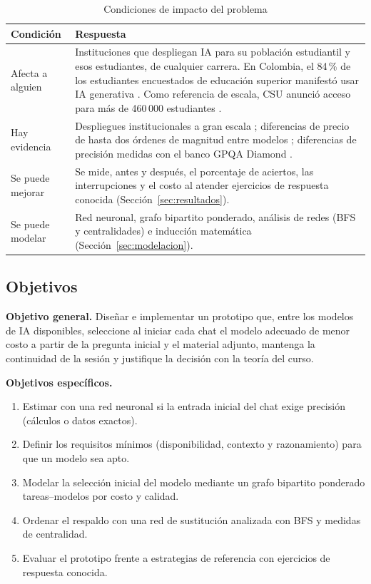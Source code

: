\documentclass[12pt,letterpaper]{article}
\begin{document}
\begin{table}[htbp]
\caption{Condiciones de impacto del problema}\label{tab:impacto}
\small
\begin{tabularx}{\textwidth}{>{\raggedright\arraybackslash}p{2.6cm}X}
\toprule
\textbf{Condición} & \textbf{Respuesta} \\
\midrule
Afecta a alguien & Instituciones que despliegan IA para su población estudiantil y esos estudiantes, de cualquier carrera. En Colombia, el 84\,\% de los estudiantes encuestados de educación superior manifestó usar IA generativa \parencite{impactotic2024}. Como referencia de escala, CSU anunció acceso para más de 460\,000 estudiantes \parencite{axios2025csu}. \\
Hay evidencia & Despliegues institucionales a gran escala \parencite{axios2025csu}; diferencias de precio de hasta dos órdenes de magnitud entre modelos \parencite{openrouter2026}; diferencias de precisión medidas con el banco GPQA Diamond \parencite{rein2023gpqa}. \\
Se puede mejorar & Se mide, antes y después, el porcentaje de aciertos, las interrupciones y el costo al atender ejercicios de respuesta conocida (Sección~\ref{sec:resultados}). \\
Se puede modelar & Red neuronal, grafo bipartito ponderado, análisis de redes (BFS y centralidades) e inducción matemática (Sección~\ref{sec:modelacion}). \\
\bottomrule
\end{tabularx}
\end{table}

\subsection{Objetivos}
\textbf{Objetivo general.} Diseñar e implementar un prototipo que, entre los modelos de IA disponibles, seleccione al iniciar cada chat el modelo adecuado de menor costo a partir de la pregunta inicial y el material adjunto, mantenga la continuidad de la sesión y justifique la decisión con la teoría del curso.

\textbf{Objetivos específicos.}
\begin{enumerate}[nosep]
  \item Estimar con una red neuronal si la entrada inicial del chat exige precisión (cálculos o datos exactos).
  \item Definir los requisitos mínimos (disponibilidad, contexto y razonamiento) para que un modelo sea apto.
  \item Modelar la selección inicial del modelo mediante un grafo bipartito ponderado tareas--modelos por costo y calidad.
  \item Ordenar el respaldo con una red de sustitución analizada con BFS y medidas de centralidad.
  \item Evaluar el prototipo frente a estrategias de referencia con ejercicios de respuesta conocida.
\end{enumerate}
\end{document}
